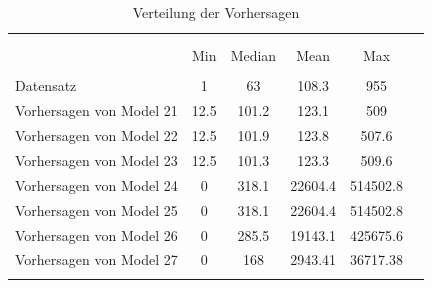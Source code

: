 \documentclass[a4paper,12pt]{thesis}
\begin{document}
\begin{table}[!htbp] \centering 
	\caption{Verteilung der Vorhersagen} 
	\label{ForecastDistribution} 
	\begin{tabular}{@{\extracolsep{-5pt}}lccccc} 
		\\[-1.8ex]\hline 
		\hline \\[-1.8ex] 
		\\[-1.8ex] & Min & Median & Mean & Max\\ 
		\hline \\[-1.8ex] 
		Datensatz & 1 & 63 & 108.3 & 955 \\ 
		Vorhersagen von Model 21	 & 12.5 & 101.2 & 123.1 & 509 \\ 
		Vorhersagen von Model 22	 & 12.5 & 101.9 & 123.8 & 507.6 \\ 
		Vorhersagen von Model 23	 & 12.5 & 101.3 & 123.3 & 509.6 \\ 
		Vorhersagen von Model 24	 & 0 & 318.1 & 22604.4 & 514502.8\\ 
		Vorhersagen von Model 25	 & 0 & 318.1 & 22604.4 & 514502.8\\ 
		Vorhersagen von Model 26	 & 0 & 285.5 & 19143.1 & 425675.6\\ 
		Vorhersagen von Model 27	 & 0 & 168 & 2943.41 & 36717.38\\ 
		\hline \\[-1.8ex] 
	\end{tabular} 
\end{table} 
\end{document}
